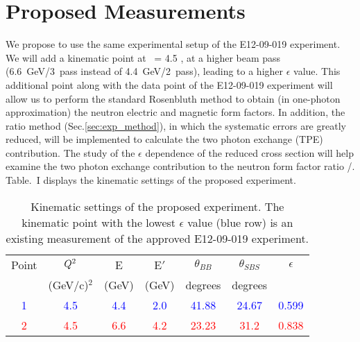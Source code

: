 \section{Proposed Measurements} 
\label{prop}

We propose to use the same experimental setup of the E12-09-019 experiment. We will add a kinematic point at \qsq~= 4.5 \gevcsq, at a higher beam pass (6.6~GeV/3~pass instead of 4.4~GeV/2~pass), leading to a higher $\epsilon$ value. This additional point along with the data point of the E12-09-019 experiment will allow us to perform the standard Rosenbluth method to obtain (in one-photon approximation) the neutron electric and magnetic form factors. In addition, the ratio method (Sec.\ref{sec:exp_method}), in which the systematic errors are greatly reduced, will be implemented to calculate  the two photon exchange (TPE) contribution. The study of the $\epsilon$ dependence of the reduced cross section will help examine the two photon exchange contribution to the neutron form factor ratio \gen/\gmn.
Table.~I displays the kinematic settings of the proposed experiment. 

\begin{table}[h] 
\centering
\begin{tabular}{|c|c|c|c|c|c|c|}
\hline
\small{Point} & $Q\textsuperscript{2}$  & E & E$'$  & $\theta_{BB}$ & $\theta_{SBS}$ & $\epsilon$ \\
& (GeV/c)$^2$ & (GeV) & (GeV)  &\; degrees\; & \; degrees \;  &   \\
\hline
\textcolor{blue} 1 &\textcolor{blue} {4.5} & \textcolor{blue}{4.4} & \textcolor{blue}{2.0} & \textcolor{blue}{41.88}  & \textcolor{blue}{24.67} &\; \textcolor{blue}{0.599} \;\\
\hline
\textcolor{red}{2} & \textcolor{red}{4.5}  &  \textcolor{red}{6.6}  &  \textcolor{red}{4.2}  & \textcolor{red}{23.23}  &  \textcolor{red}{31.2}  &  \textcolor{red}{0.838} \\
\hline
\end{tabular} 
\caption{Kinematic settings of the proposed experiment. The kinematic point with the lowest $\epsilon$ value (blue row) is an existing measurement of the approved  E12-09-019 experiment.}
\label{tab:propkin}
\end{table}

